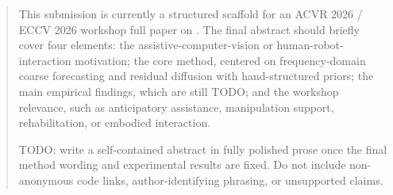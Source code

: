 \begin{abstract}
This submission is currently a structured scaffold for an ACVR 2026 / ECCV 2026 workshop full paper on \modelname. The final abstract should briefly cover four elements: the assistive-computer-vision or human-robot-interaction motivation; the core method, centered on frequency-domain coarse forecasting and residual diffusion with hand-structured priors; the main empirical findings, which are still TODO; and the workshop relevance, such as anticipatory assistance, manipulation support, rehabilitation, or embodied interaction.

TODO: write a self-contained abstract in fully polished prose once the final method wording and experimental results are fixed. Do not include non-anonymous code links, author-identifying phrasing, or unsupported claims.

\end{abstract}
